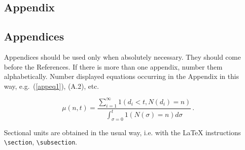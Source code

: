 \begin{appendix}
\chapter{Appendix}

\section{Appendices}\label{appendix}
Appendices should be used only when absolutely necessary. They
should come before the References. If there is more than one
appendix, number them alphabetically. Number displayed equations
occurring in the Appendix in this way, e.g.~(\ref{appeq1}), (A.2),
etc.

\begin{equation} \mu(n, t) = \frac{\sum^\infty_{i=1} 1(d_i < t,
N(d_i) = n)} {\int^t_{\sigma=0} 1(N(\sigma) = n)d\sigma}\,.
\label{appeq1}
\end{equation}

Sectional units are obtained in the usual way, i.e. with the
\LaTeX{} instructions \verb|\section|, \verb|\subsection|.


\end{appendix}
